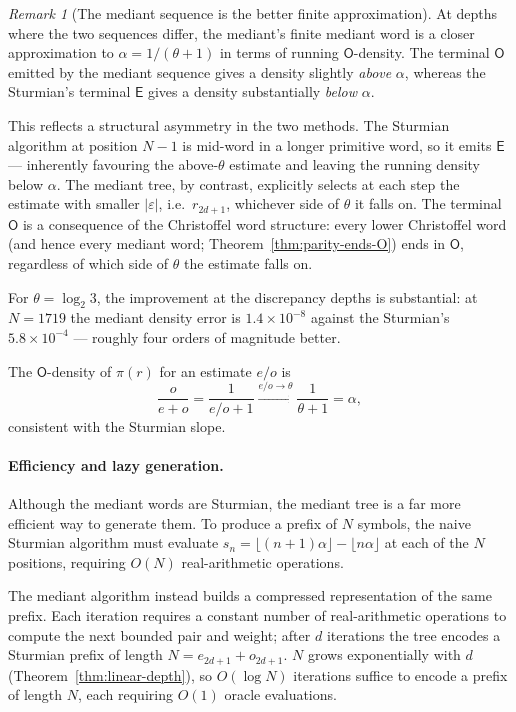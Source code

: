 \documentclass[12pt]{article}
\theoremstyle{definition}
\theoremstyle{remark}
\newtheorem{remark}[theorem]{Remark}
\theoremstyle{plain}
\newcommand{\OO}{\mathsf{O}}
\newcommand{\EE}{\mathsf{E}}
\begin{document}
\begin{remark}[The mediant sequence is the better finite approximation]
At depths where the two sequences differ, the mediant's finite mediant word is a
closer approximation to $\alpha = 1/(\theta+1)$ in terms of running $\OO$-density.
The terminal $\OO$ emitted by the mediant sequence gives a density slightly
\emph{above} $\alpha$, whereas the Sturmian's terminal $\EE$ gives a density
substantially \emph{below} $\alpha$.

This reflects a structural asymmetry in the two methods.
The Sturmian algorithm at position $N-1$ is mid-word in a longer primitive word,
so it emits $\EE$ --- inherently favouring the above-$\theta$ estimate and leaving the
running density below $\alpha$.
The mediant tree, by contrast, explicitly selects at each step the estimate with
smaller $|\varepsilon|$, i.e.\ $r_{2d+1}$, whichever side of $\theta$ it falls on.
The terminal $\OO$ is a consequence of the Christoffel word structure: every lower
Christoffel word (and hence every mediant word; Theorem~\ref{thm:parity-ends-O}) ends
in $\OO$, regardless of which side of $\theta$ the estimate falls on.

For $\theta = \log_2 3$, the improvement at the discrepancy depths is substantial:
at $N = 1719$ the mediant density error is $1.4 \times 10^{-8}$ against the
Sturmian's $5.8 \times 10^{-4}$ --- roughly four orders of magnitude better.
\end{remark}

The $\OO$-density of $\pi(r)$ for an estimate $e/o$ is
\[
  \frac{o}{e+o} = \frac{1}{e/o + 1} \xrightarrow{e/o \to \theta} \frac{1}{\theta+1} = \alpha,
\]
consistent with the Sturmian slope.

\paragraph{Efficiency and lazy generation.}
Although the mediant words are Sturmian, the mediant tree is a far more efficient
way to generate them.
To produce a prefix of $N$ symbols, the naive Sturmian algorithm must evaluate
$s_n = \lfloor(n+1)\alpha\rfloor - \lfloor n\alpha\rfloor$ at each of the $N$
positions, requiring $O(N)$ real-arithmetic operations.

The mediant algorithm instead builds a compressed representation of the same prefix.
Each iteration requires a constant number of real-arithmetic operations to compute
the next bounded pair and weight; after $d$ iterations the tree encodes a Sturmian
prefix of length $N = e_{2d+1} + o_{2d+1}$.
$N$ grows exponentially with $d$ (Theorem~\ref{thm:linear-depth}), so $O(\log N)$ iterations suffice to encode
a prefix of length $N$, each requiring $O(1)$ oracle evaluations.
\end{document}
